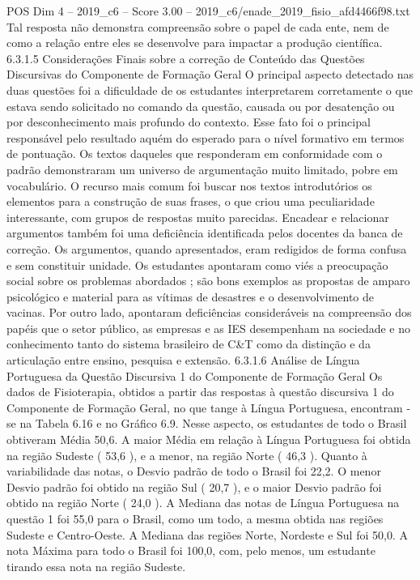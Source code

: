 \begin{textsample}{POS Dim 4 – 2019\_c6 – Score 3.00 – 2019\_c6/enade\_2019\_fisio\_afd4466f98.txt}
Tal resposta não demonstra compreensão sobre o papel de cada ente, nem de como a relação entre eles se desenvolve para impactar a produção científica. 6.3.1.5 Considerações Finais sobre a correção de Conteúdo das Questões Discursivas do Componente de Formação Geral O principal aspecto detectado nas duas questões foi a dificuldade de os estudantes interpretarem corretamente o que estava sendo solicitado no comando da questão, causada ou por desatenção ou por desconhecimento mais profundo do contexto.
Esse fato foi o principal responsável pelo resultado aquém do esperado para o nível formativo em termos de pontuação.
Os textos daqueles que responderam em conformidade com o padrão demonstraram um universo de argumentação muito limitado, pobre em vocabulário.
O recurso mais comum foi buscar nos textos introdutórios os elementos para a construção de suas frases, o que criou uma peculiaridade interessante, com grupos de respostas muito parecidas.
Encadear e relacionar argumentos também foi uma deficiência identificada pelos docentes da banca de correção.
Os argumentos, quando apresentados, eram redigidos de forma confusa e sem constituir unidade.
Os estudantes apontaram como viés a preocupação social sobre os problemas abordados ; são bons exemplos as propostas de amparo psicológico e material para as vítimas de desastres e o desenvolvimento de vacinas.
Por outro lado, apontaram deficiências consideráveis na compreensão dos papéis que o setor público, as empresas e as IES desempenham na sociedade e no conhecimento tanto do sistema brasileiro de C\&T como da distinção e da articulação entre ensino, pesquisa e extensão. 6.3.1.6 Análise de Língua Portuguesa da Questão Discursiva 1 do Componente de Formação Geral Os dados de Fisioterapia, obtidos a partir das respostas à questão discursiva 1 do Componente de Formação Geral, no que tange à Língua Portuguesa, encontram -se na Tabela 6.16 e no Gráfico 6.9.
Nesse aspecto, os estudantes de todo o Brasil obtiveram Média 50,6.
A maior Média em relação à Língua Portuguesa foi obtida na região Sudeste ( 53,6 ), e a menor, na região Norte ( 46,3 ).
Quanto à variabilidade das notas, o Desvio padrão de todo o Brasil foi 22,2.
O menor Desvio padrão foi obtido na região Sul ( 20,7 ), e o maior Desvio padrão foi obtido na região Norte ( 24,0 ).
A Mediana das notas de Língua Portuguesa na questão 1 foi 55,0 para o Brasil, como um todo, a mesma obtida nas regiões Sudeste e Centro-Oeste.
A Mediana das regiões Norte, Nordeste e Sul foi 50,0.
A nota Máxima para todo o Brasil foi 100,0, com, pelo menos, um estudante tirando essa nota na região Sudeste.

\end{textsample}

